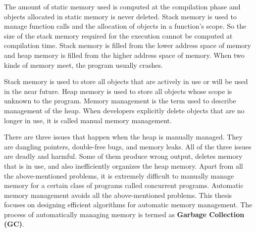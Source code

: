 The amount of static memory used is computed at the compilation phase and objects allocated in static memory is never deleted. Stack memory is used to manage function calls and the allocation of objects in a function's scope. So the size of the stack memory required for the execution cannot be computed at compilation time. Stack memory is filled from the lower address space of memory and heap memory is filled from the higher address space of memory. When two kinds of memory meet, the program usually crashes. 

Stack memory is used to store all objects that are actively in use or will be used in the near future. Heap memory is used to store all objects whose scope is unknown to the program. Memory management is the term used to describe management of the heap. When developers explicitly delete objects that are no longer in use, it is called manual memory management. 

There are three issues that happen when the heap is manually managed. They are dangling pointers, double-free bugs, and memory leaks. All of the three issues are deadly and harmful. Some of them produce wrong output, deletes memory that is in use, and also inefficiently organizes the heap memory.  Apart from all the above-mentioned problems, it is extremely difficult to manually manage memory for a certain class of programs called concurrent programs. Automatic memory
management avoids all the above-mentioned problems.
This thesis focuses on designing efficient algorithms for automatic memory management. The process of automatically managing memory is termed as \textbf{Garbage Collection (GC)}.
\begin{comment}
Heap memory helps a developer to extend the life of dynamically allocated objects. Some object allocated in the heap might get a very long life as long as the life of the program running. So these objects have an infinite life if the programmer did not delete them after their last use. The unwanted objects in the heap occupy the heap memory and might make an application run out of memory and exit. In order to avoid pseudo full heap memory errors, programmers determine the life of the dynamically allocated objects and delete them. The dynamically allocated objects can be accessed only by pointers in the static and stack memory. These pointers are also called as \textbf{roots}.
\end{comment}
